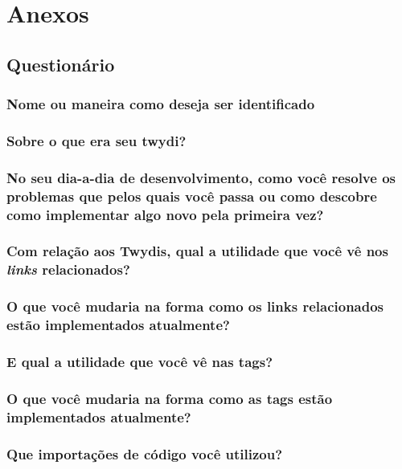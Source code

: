 \chapter{Anexos}

\section{Questionário}

\subsection{Nome ou maneira como deseja ser identificado}

\subsection{Sobre o que era seu twydi?}

\subsection{No seu dia-a-dia de desenvolvimento, como você resolve os problemas que pelos quais você passa ou como descobre como implementar algo novo pela primeira vez?}

\subsection{Com relação aos Twydis, qual a utilidade que você vê nos \textit{links} relacionados?}

\subsection{O que você mudaria na forma como os links relacionados estão implementados atualmente?}

\subsection{E qual a utilidade que você vê nas tags?}

\subsection{O que você mudaria na forma como as tags estão implementados atualmente?}

\subsection{Que importações de código você utilizou?}

